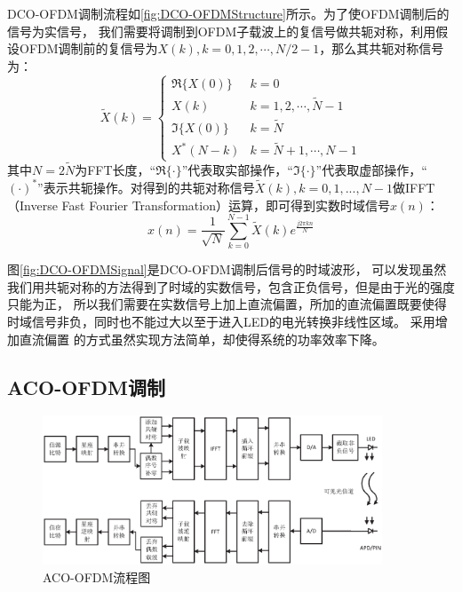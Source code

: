 DCO-OFDM调制流程如\autoref{fig:DCO-OFDMStructure}所示。为了使OFDM调制后的信号为实信号，
我们需要将调制到OFDM子载波上的复信号做共轭对称\cite{proakisdigital}，利用假设OFDM调制前的复信号为$X(k),k = 0, 1, 2, \cdots, N/2-1$，那么其共轭对称信号为：
\begin{equation}
    \tilde{X}(k) =
    \begin{cases}
        \Re\{X(0)\}  & k = 0 \\
        X(k) & k = 1, 2, \cdots, \tilde{N}-1 \\
        \Im\{X(0)\} & k = \tilde{N} \\
        X^*(N-k) & k = \tilde{N}+1, \cdots, N-1
    \end{cases}
    \label{equ:HermitianSymmetry}
\end{equation}
其中$N=2\tilde{N}$为FFT长度，“$\Re\{\cdot\}$”代表取实部操作，“$\Im\{\cdot\}$”代表取虚部操作，“$(\cdot)^*$”表示共轭操作。对得到的共轭对称信号$\tilde{X}(k),k=0,1,...,N-1$做IFFT（Inverse Fast Fourier Transformation）运算，即可得到实数时域信号$x(n)$：
\begin{equation}
    x(n) = \frac{1}{\sqrt{N}}\sum \limits_{k=0}^{N-1}\tilde{X}(k)e^{\frac{j2\pi kn}{N}}
    \label{equ:DCO_OFDM_Sig}
\end{equation}

图\autoref{fig:DCO-OFDMSignal}是DCO-OFDM调制后信号的时域波形，
可以发现虽然我们用共轭对称的方法得到了时域的实数信号，包含正负信号，但是由于光的强度只能为正，
所以我们需要在实数信号上加上直流偏置，所加的直流偏置既要使得时域信号非负，同时也不能过大以至于进入LED的电光转换非线性区域。
采用增加直流偏置
的方式虽然实现方法简单，却使得系统的功率效率下降。

\subsection{ACO-OFDM调制}

\begin{figure}[h]
    \centering
    \includegraphics[width=0.9\textwidth]{figures/Chapter-2/ACO-OFDMStructure.eps}
    \caption{ACO-OFDM流程图}
    \label{fig:ACO-OFDMStructure}
\end{figure}

